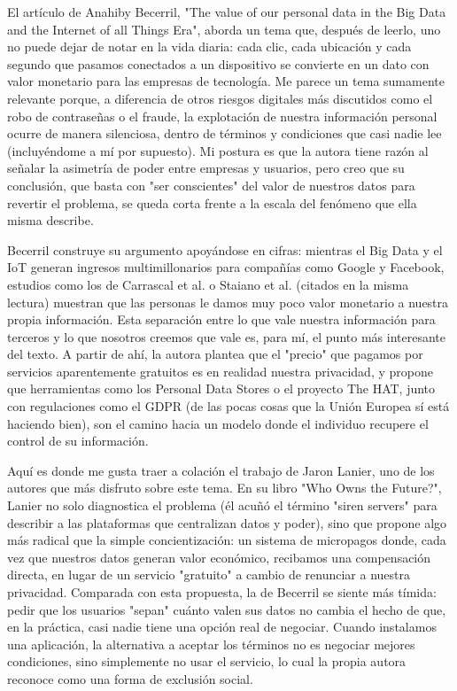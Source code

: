 El artículo de Anahiby Becerril, "The value of our personal data in the Big Data and the Internet of all Things Era", aborda un tema que, después de leerlo, uno no puede dejar de notar en la vida diaria: cada clic, cada ubicación y cada segundo que pasamos conectados a un dispositivo se convierte en un dato con valor monetario para las empresas de tecnología. Me parece un tema sumamente relevante porque, a diferencia de otros riesgos digitales más discutidos como el robo de contraseñas o el fraude, la explotación de nuestra información personal ocurre de manera silenciosa, dentro de términos y condiciones que casi nadie lee (incluyéndome a mí por supuesto). Mi postura es que la autora tiene razón al señalar la asimetría de poder entre empresas y usuarios, pero creo que su conclusión, que basta con "ser conscientes" del valor de nuestros datos para revertir el problema, se queda corta frente a la escala del fenómeno que ella misma describe.

Becerril construye su argumento apoyándose en cifras: mientras el Big Data y el IoT generan ingresos multimillonarios para compañías como Google y Facebook, estudios como los de Carrascal et al. o Staiano et al. (citados en la misma lectura) muestran que las personas le damos muy poco valor monetario a nuestra propia información. Esta separación entre lo que vale nuestra información para terceros y lo que nosotros creemos que vale es, para mí, el punto más interesante del texto. A partir de ahí, la autora plantea que el "precio" que pagamos por servicios aparentemente gratuitos es en realidad nuestra privacidad, y propone que herramientas como los Personal Data Stores o el proyecto The HAT, junto con regulaciones como el GDPR (de las pocas cosas que la Unión Europea sí está haciendo bien), son el camino hacia un modelo donde el individuo recupere el control de su información.

Aquí es donde me gusta traer a colación el trabajo de Jaron Lanier, uno de los autores que más disfruto sobre este tema. En su libro "Who Owns the Future?", Lanier no solo diagnostica el problema (él acuñó el término "siren servers" para describir a las plataformas que centralizan datos y poder), sino que propone algo más radical que la simple concientización: un sistema de micropagos donde, cada vez que nuestros datos generan valor económico, recibamos una compensación directa, en lugar de un servicio "gratuito" a cambio de renunciar a nuestra privacidad. Comparada con esta propuesta, la de Becerril se siente más tímida: pedir que los usuarios "sepan" cuánto valen sus datos no cambia el hecho de que, en la práctica, casi nadie tiene una opción real de negociar. Cuando instalamos una aplicación, la alternativa a aceptar los términos no es negociar mejores condiciones, sino simplemente no usar el servicio, lo cual la propia autora reconoce como una forma de exclusión social.

